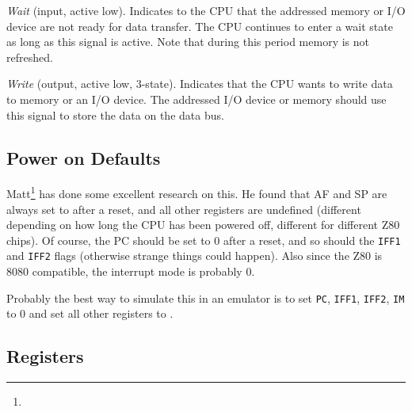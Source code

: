 \begin{description}[leftmargin=1.5em]
	\item[\NoLinkChipPinLabel{WAIT}]
	{\em Wait} (input, active low). Indicates to the CPU that the addressed memory or I/O device are not ready for data transfer. The CPU continues to enter a wait state as long as this signal is active. Note that during this period memory is not refreshed.

	\item[\NoLinkChipPinLabel{WR}]
	{\em Write} (output, active low, 3-state). Indicates that the CPU wants to write data to memory or an I/O device. The addressed I/O device or memory should use this signal to store the data on the data bus.

\end{description}


\subsection{Power on Defaults}
\label{z80_power_on_defaults}

Matt\footnote{} has done some excellent research on this. He found that AF and SP are always set to  after a reset, and all other registers are undefined (different depending on how long the CPU has been powered off, different for different Z80 chips). Of course, the PC should be set to 0 after a reset, and so should the {\tt IFF1} and {\tt IFF2} flags (otherwise strange things could happen). Also since the Z80 is 8080 compatible, the interrupt mode is probably 0.

Probably the best way to simulate this in an emulator is to set {\tt PC}, {\tt IFF1}, {\tt IFF2}, {\tt IM} to 0 and set all other registers to .


\subsection{Registers}

